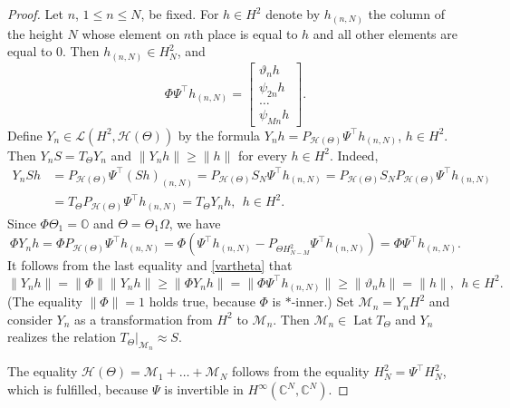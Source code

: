 \documentclass[a4paper,oneside,11pt]{amsart}
\numberwithin{equation}{section}
\theoremstyle{plain}
\theoremstyle{definition}
\begin{document}
\begin{proof}
Let  $n$, $1\leq n\leq N$, be fixed. For $h\in H^2$ denote by $h_{(n,N)}$ the column of the height $N$ 
whose element on $n$th place is equal to $h$ 
and all other elements are equal to $0$.  Then  $h_{(n,N)}\in H^2_N$, and 
\begin{equation}\label{vartheta}
\Phi\Psi^\top h_{(n,N)}=\left[\begin{matrix} \vartheta_n h\\ 
  \psi_{2n}h\\ 
 \ldots  \\ \psi_{Mn}h \end{matrix}\right].
\end{equation}
Define $Y_n\in\mathcal L( H^2, \mathcal H(\Theta))$ by the formula
  $Y_n h=P_{\mathcal H(\Theta)}\Psi^\top h_{(n,N)}$, $h\in H^2$. 
Then $Y_n S=T_\Theta Y_n$ and $\|Y_n h\|\geq\|h\|$ for every $h\in H^2$.
Indeed, 
\begin{align*} Y_n Sh&=P_{\mathcal H(\Theta)}\Psi^\top (Sh)_{(n,N)}=
P_{\mathcal H(\Theta)}S_N\Psi^\top h_{(n,N)}=P_{\mathcal H(\Theta)}S_NP_{\mathcal H(\Theta)}\Psi^\top h_{(n,N)} 
\\ &=
T_\Theta P_{\mathcal H(\Theta)}\Psi^\top h_{(n,N)}= T_\Theta Y_n h, \ \ h\in H^2.
\end{align*}
Since $\Phi\Theta_1=\mathbb O$ and $\Theta=\Theta_1\Omega$, we have  
\begin{equation*} \Phi Y_n h=\Phi P_{\mathcal H(\Theta)}\Psi^\top h_{(n,N)}= 
\Phi(\Psi^\top h_{(n,N)}-P_{\Theta H^2_{N-M}}\Psi^\top h_{(n,N)})= \Phi\Psi^\top h_{(n,N)}.
\end{equation*}
It follows from the last equality and \eqref{vartheta} that 
\begin{equation*} \|Y_n h\| = \|\Phi\| \|Y_n h\|\geq  \|\Phi Y_n h\|= \|\Phi\Psi^\top h_{(n,N)}\|\geq \|\vartheta_n h\|=\|h\|, \ \ h\in H^2.
\end{equation*}
(The equality $\|\Phi\|=1$ holds true, because $\Phi$ is $*$-inner.)
Set $\mathcal M_n=Y_n H^2$ and consider $Y_n$ as a transformation from $H^2$ to $\mathcal M_n$. Then 
  $\mathcal M_n\in\operatorname{Lat}T_\Theta$ and $Y_n$ realizes the relation $T_\Theta|_{\mathcal M_n}\approx S$.  

The equality $\mathcal H(\Theta)=\mathcal M_1+\ldots+\mathcal M_N$ 
 follows from the equality $H^2_N=\Psi^\top H^2_N$, which is fulfilled, because $\Psi$ is invertible in 
$H^\infty(\mathbb C^N, \mathbb C^N)$.
\end{proof}
\end{document}
